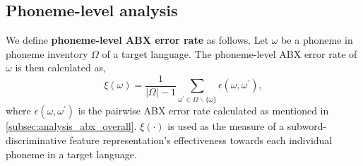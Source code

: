 \documentclass[transmag]{IEEEtran}
\begin{document}


\subsection{Phoneme-level analysis}
\label{subsec:analysis_phoneme_level}
We define   \textbf{phoneme-level  ABX error rate}  as follows. 
Let $\omega$ be a phoneme in phoneme inventory $\Omega$ of a target language. The phoneme-level ABX error rate of $\omega$ is then calculated as,
\begin{equation}
 \xi(\omega) =  \frac{1}{\left| \Omega \right| -1}  \sum_{\omega^{\prime} \in \Omega \backslash \{\omega\} } \epsilon(\omega, \omega^{\prime}),
\end{equation}
where  $\epsilon(\omega, \omega^{\prime})$ is the pairwise ABX error rate calculated as mentioned in \ref{subsec:analysis_abx_overall}. 
$\xi(\cdot)$ is used as the measure of a subword-discriminative feature representation’s effectiveness towards each individual phoneme in a target language. 
\end{document}

